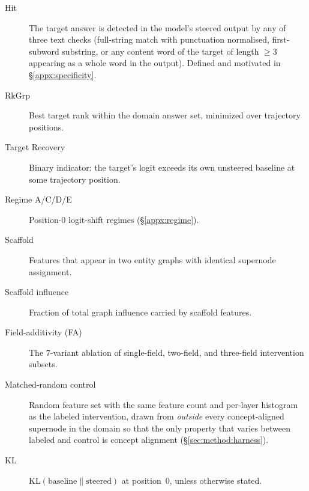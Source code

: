 \begin{description}
\item[Hit] The target answer is detected in the model's steered output by any of three text checks (full-string match with punctuation normalised, first-subword substring, or any content word of the target of length $\geq 3$ appearing as a whole word in the output). Defined and motivated in \S\ref{appx:specificity}.
\item[RkGrp] Best target rank within the domain answer set, minimized over trajectory positions.
\item[Target Recovery] Binary indicator: the target's logit exceeds its own unsteered baseline at some trajectory position.
\item[Regime A/C/D/E] Position-0 logit-shift regimes (\S\ref{appx:regime}).
\item[Scaffold] Features that appear in two entity graphs with identical supernode assignment.
\item[Scaffold influence] Fraction of total graph influence carried by scaffold features.
\item[Field-additivity (FA)] The $7$-variant ablation of single-field, two-field, and three-field intervention subsets.
\item[Matched-random control] Random feature set with the same feature count and per-layer histogram as the labeled intervention, drawn from \emph{outside} every concept-aligned supernode in the domain so that the only property that varies between labeled and control is concept alignment (\S\ref{sec:method:harness}).
\item[KL] KL$(\mathrm{baseline} \parallel \mathrm{steered})$ at position~0, unless otherwise stated.
\end{description}
